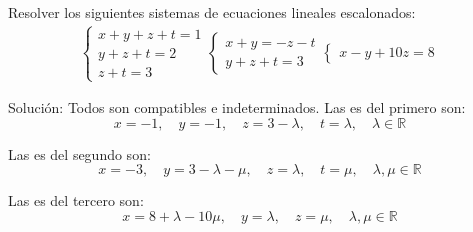 \begin{ejercicio} Resolver los siguientes sistemas de ecuaciones lineales escalonados:
	\begin{align*}
		\begin{cases}
			x + y + z + t = 1 \\
			y + z + t = 2     \\
			z + t = 3
		\end{cases}
		\begin{cases}
			x + y = -z - t \\
			y + z + t = 3
		\end{cases}
		\begin{cases}
			x - y + 10z = 8
		\end{cases}
	\end{align*}


	Solución: Todos son compatibles e indeterminados. Las es del primero son:
	\[
		x = -1, \quad y = -1, \quad z = 3 - \lambda, \quad t = \lambda, \quad \lambda \in \mathbb{R}
	\]

	Las es del segundo son:
	\[
		x = -3, \quad y = 3 - \lambda - \mu, \quad z = \lambda, \quad t = \mu, \quad \lambda, \mu \in \mathbb{R}
	\]

	Las es del tercero son:
	\[
		x = 8 + \lambda - 10\mu, \quad y = \lambda, \quad z = \mu, \quad \lambda, \mu \in \mathbb{R}
	\]
\end{ejercicio}
